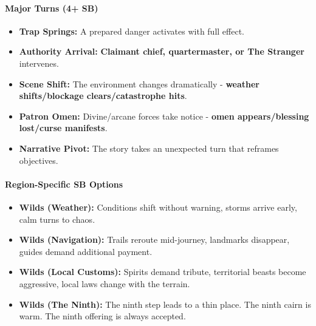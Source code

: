 \paragraph{Major Turns (4+ SB)}
\begin{itemize}
\item \textbf{Trap Springs:} A prepared danger activates with full effect.
\item \textbf{Authority Arrival:} \textbf{Claimant chief, quartermaster, or The Stranger} intervenes.
\item \textbf{Scene Shift:} The environment changes dramatically - \textbf{weather shifts/blockage clears/catastrophe hits}.
\item \textbf{Patron Omen:} Divine/arcane forces take notice - \textbf{omen appears/blessing lost/curse manifests}.
\item \textbf{Narrative Pivot:} The story takes an unexpected turn that reframes objectives.
\end{itemize}

\paragraph{Region-Specific SB Options}
\begin{itemize}
\item \textbf{Wilds (Weather):} Conditions shift without warning, storms arrive early, calm turns to chaos.
\item \textbf{Wilds (Navigation):} Trails reroute mid-journey, landmarks disappear, guides demand additional payment.
\item \textbf{Wilds (Local Customs):} Spirits demand tribute, territorial beasts become aggressive, local laws change with the terrain.
\item \textbf{Wilds (The Ninth):} The ninth step leads to a thin place. The ninth cairn is warm. The ninth offering is always accepted.
\end{itemize}

